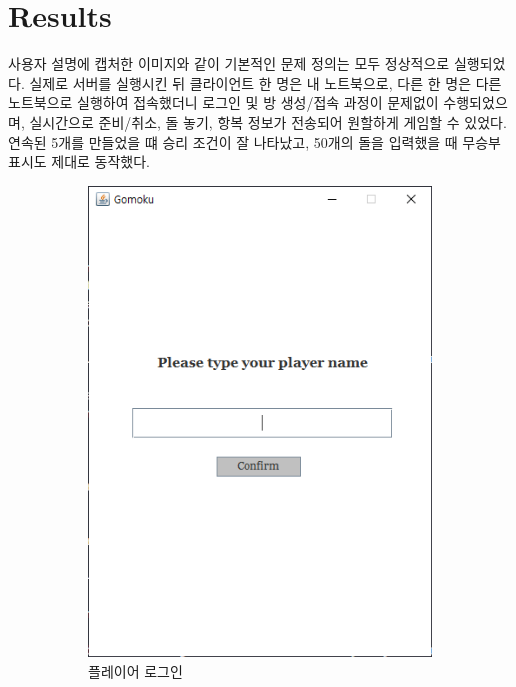 \documentclass[a4paper, 10pt]{article}
\begin{document}
\section{Results}
사용자 설명에 캡처한 이미지와 같이 기본적인 문제 정의는 모두 정상적으로 실행되었다.
실제로 서버를 실행시킨 뒤 클라이언트 한 명은 내 노트북으로, 다른 한 명은 다른 노트북으로
실행하여 접속했더니 로그인 및 방 생성/접속 과정이 문제없이 수행되었으며,
실시간으로 준비/취소, 돌 놓기, 항복 정보가 전송되어 원할하게 게임할
수 있었다. 연속된 5개를 만들었을 떄 승리 조건이 잘 나타났고, 50개의 돌을 입력했을 때
무승부 표시도 제대로 동작했다.
\begin{figure}[h]
  \centering
  \begin{subfigure}{.3\textwidth}
    \centering
    \includegraphics[width=.9\linewidth]{resource/login}
    \caption{플레이어 로그인}
    \label{fig:login}
  \end{subfigure}
  \begin{subfigure}{.3\textwidth}
    \centering

\end{subfigure}
\end{figure}
\end{document}
